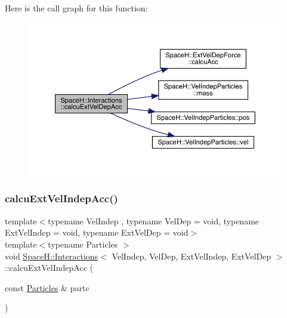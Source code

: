 Here is the call graph for this function\+:
\nopagebreak
\begin{figure}[H]
\begin{center}
\leavevmode
\includegraphics[width=350pt]{class_space_h_1_1_interactions_a4d2c97809af5989a1a47def9e2fb0f35_cgraph}
\end{center}
\end{figure}
\mbox{\label{class_space_h_1_1_interactions_a56561622edc899080000b5bafce1fb79}} 
\subsubsection{\texorpdfstring{calcu\+Ext\+Vel\+Indep\+Acc()}{calcuExtVelIndepAcc()}}
{\footnotesize\ttfamily template$<$typename Vel\+Indep , typename Vel\+Dep  = void, typename Ext\+Vel\+Indep  = void, typename Ext\+Vel\+Dep  = void$>$ \\
template$<$typename Particles $>$ \\
void \mbox{\hyperlink{class_space_h_1_1_interactions}{Space\+H\+::\+Interactions}}$<$ Vel\+Indep, Vel\+Dep, Ext\+Vel\+Indep, Ext\+Vel\+Dep $>$\+::calcu\+Ext\+Vel\+Indep\+Acc (\begin{DoxyParamCaption}\item[{const \mbox{\hyperlink{struct_space_h_1_1_particles}{Particles}} \&}]{partc }\end{DoxyParamCaption})\hspace{0.3cm}{\ttfamily [inline]}}

